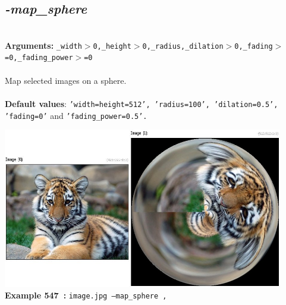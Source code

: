 \documentclass[a4paper,11pt,twoside]{book}
\begin{document}
\subsection{\emph{-map\_sphere} }\vspace*{-0.5em}
~\\\textbf{Arguments: } 
{\small \texttt{\_width$>$0,\_height$>$0,\_radius,\_dilation$>$0,\_fading$>$=0,\_fading\_power$>$=0}}\\~\\
Map selected images on a sphere.
~\\~\\\textbf{Default values}: {\small \texttt{'width=height=512', 'radius=100', 'dilation=0.5', 'fading=0'} and \texttt{'fading\_power=0.5'.}}
\begin{center}\includegraphics[keepaspectratio=true,height=7cm,width=\textwidth]{img/gmic_def547.jpg}\\
{\footnotesize \textbf{Example 547~:} \texttt{image.jpg --map\_sphere ,}}
\end{center}
\end{document}
